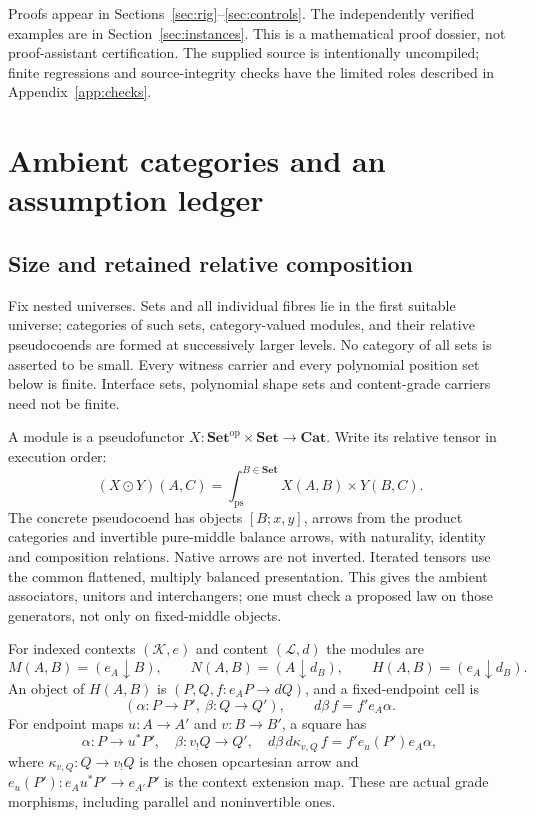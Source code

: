 \documentclass[11pt,a4paper]{article}
\theoremstyle{definition}
\newcommand{\Set}{\mathbf{Set}}
\newcommand{\Cat}{\mathbf{Cat}}
\newcommand{\Lcat}{\mathcal L}
\newcommand{\K}{\mathcal K}
\newcommand{\psint}{\int_{\mathrm{ps}}}
\begin{document}
Proofs appear in Sections~\ref{sec:rig}--\ref{sec:controls}. The independently
verified examples are in Section~\ref{sec:instances}. This is a mathematical
proof dossier, not proof-assistant certification. The supplied source is
intentionally uncompiled; finite regressions and source-integrity checks have
the limited roles described in Appendix~\ref{app:checks}.

\section{Ambient categories and an assumption ledger}\label{sec:ambient}

\subsection{Size and retained relative composition}
Fix nested universes. Sets and all individual fibres lie in the first suitable
universe; categories of such sets, category-valued modules, and their relative
pseudocoends are formed at successively larger levels. No category of all sets
is asserted to be small. Every witness carrier and every polynomial position
set below is finite. Interface sets, polynomial shape sets and content-grade
carriers need not be finite.

A module is a pseudofunctor $X:\Set^{\mathrm{op}}\times\Set\to\Cat$.
Write its relative tensor in execution order:
\[
 (X\odot Y)(A,C)=\psint^{B\in\Set}X(A,B)\times Y(B,C).
\]
The concrete pseudocoend has objects $[B;x,y]$, arrows from the product
categories and invertible pure-middle balance arrows, with naturality, identity
and composition relations. Native arrows are not inverted. Iterated tensors
use the common flattened, multiply balanced presentation. This gives the
ambient associators, unitors and interchangers; one must check a proposed law
on those generators, not only on fixed-middle objects.

For indexed contexts $(\K,e)$ and content $(\Lcat,d)$ the modules are
\[
 M(A,B)=(e_A\downarrow B),\qquad
 N(A,B)=(A\downarrow d_B),\qquad
 H(A,B)=(e_A\downarrow d_B).
\]
An object of $H(A,B)$ is $(P,Q,f:e_AP\to dQ)$, and a fixed-endpoint cell is
\begin{equation}\label{eq:comma}
 (\alpha:P\to P',\ \beta:Q\to Q'),\qquad
 d\beta\,f=f'e_A\alpha.
\end{equation}
For endpoint maps $u:A\to A'$ and $v:B\to B'$, a square has
\begin{equation}\label{eq:endpoints}
 \alpha:P\to u^*P',\quad \beta:v_!Q\to Q',\quad
 d\beta\,d\kappa_{v,Q}\,f
 =f'e_u(P')e_A\alpha,
\end{equation}
where $\kappa_{v,Q}:Q\to v_!Q$ is the chosen opcartesian arrow and
$e_u(P'):e_Au^*P'\to e_{A'}P'$ is the context extension map. These are
actual grade morphisms, including parallel and noninvertible ones.
\end{document}
